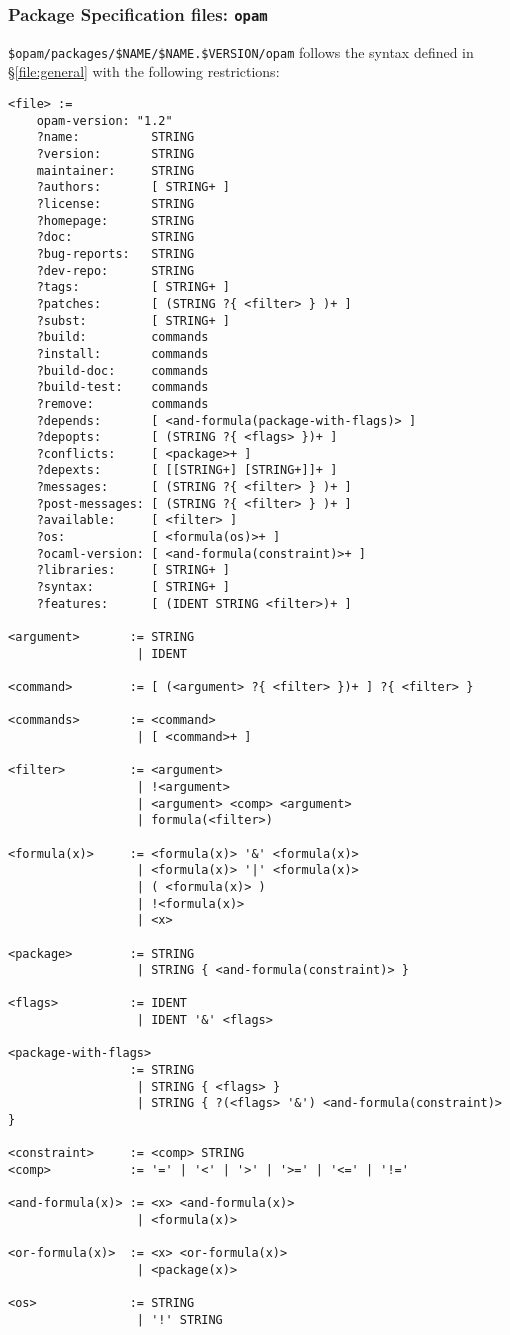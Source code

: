 \documentclass[a4paper,10pt]{article}
\begin{document}
\subsubsection{Package Specification files: {\tt opam}}
\label{file:opam}

\verb+$opam/packages/$NAME/$NAME.$VERSION/opam+ follows the syntax defined in
\S\ref{file:general} with the following restrictions:

\begin{Verbatim}
<file> :=
    opam-version: "1.2"
    ?name:          STRING
    ?version:       STRING
    maintainer:     STRING
    ?authors:       [ STRING+ ]
    ?license:       STRING
    ?homepage:      STRING
    ?doc:           STRING
    ?bug-reports:   STRING
    ?dev-repo:      STRING
    ?tags:          [ STRING+ ]
    ?patches:       [ (STRING ?{ <filter> } )+ ]
    ?subst:         [ STRING+ ]
    ?build:         commands
    ?install:       commands
    ?build-doc:     commands
    ?build-test:    commands
    ?remove:        commands
    ?depends:       [ <and-formula(package-with-flags)> ]
    ?depopts:       [ (STRING ?{ <flags> })+ ]
    ?conflicts:     [ <package>+ ]
    ?depexts:       [ [[STRING+] [STRING+]]+ ]
    ?messages:      [ (STRING ?{ <filter> } )+ ]
    ?post-messages: [ (STRING ?{ <filter> } )+ ]
    ?available:     [ <filter> ]
    ?os:            [ <formula(os)>+ ]
    ?ocaml-version: [ <and-formula(constraint)>+ ]
    ?libraries:     [ STRING+ ]
    ?syntax:        [ STRING+ ]
    ?features:      [ (IDENT STRING <filter>)+ ]

<argument>       := STRING
                  | IDENT

<command>        := [ (<argument> ?{ <filter> })+ ] ?{ <filter> }

<commands>       := <command>
                  | [ <command>+ ]

<filter>         := <argument>
                  | !<argument>
                  | <argument> <comp> <argument>
                  | formula(<filter>)

<formula(x)>     := <formula(x)> '&' <formula(x)>
                  | <formula(x)> '|' <formula(x)>
                  | ( <formula(x)> )
                  | !<formula(x)>
                  | <x>

<package>        := STRING
                  | STRING { <and-formula(constraint)> }

<flags>          := IDENT
                  | IDENT '&' <flags>

<package-with-flags>
                 := STRING
                  | STRING { <flags> }
                  | STRING { ?(<flags> '&') <and-formula(constraint)> }

<constraint>     := <comp> STRING
<comp>           := '=' | '<' | '>' | '>=' | '<=' | '!='

<and-formula(x)> := <x> <and-formula(x)>
                  | <formula(x)>

<or-formula(x)>  := <x> <or-formula(x)>
                  | <package(x)>

<os>             := STRING
                  | '!' STRING
\end{Verbatim}
\end{document}
